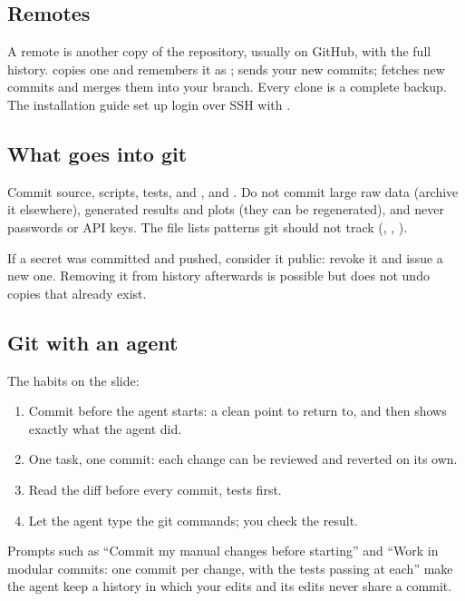 \subsection{Remotes}

A remote is another copy of the repository, usually on GitHub, with the full history.
 copies one and remembers it as ;  sends your new
commits;  fetches new commits and merges them into your branch. Every clone
is a complete backup. The installation guide set up login over SSH with .

\subsection{What goes into git}

Commit source, scripts, tests,  and ,
 and . Do not commit large raw data (archive it elsewhere),
generated results and plots (they can be regenerated), and never passwords or API keys.
The  file lists patterns git should not track (,
, ).

If a secret was committed and pushed, consider it public: revoke it and issue a new one.
Removing it from history afterwards is possible but does not undo copies that already
exist.

\subsection{Git with an agent}

The habits on the slide:
\begin{enumerate}
  \item Commit before the agent starts: a clean point to return to, and
         then shows exactly what the agent did.
  \item One task, one commit: each change can be reviewed and reverted on its own.
  \item Read the diff before every commit, tests first.
  \item Let the agent type the git commands; you check the result.
\end{enumerate}
Prompts such as ``Commit my manual changes before starting'' and ``Work in modular
commits: one commit per change, with the tests passing at each'' make the agent keep a
history in which your edits and its edits never share a commit.

